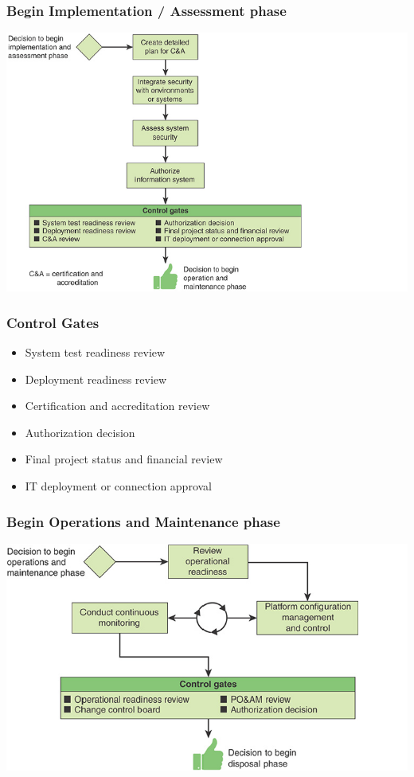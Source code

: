 \subsubsection{Begin Implementation / Assessment phase}
\includegraphics[width=\linewidth]{../img/develop_and_test2.png}

\subsubsection{Control Gates}
\begin{itemize}
    \item System test readiness review
    \item Deployment readiness review
    \item Certification and accreditation review
    \item Authorization decision
    \item Final project status and financial review
    \item IT deployment or connection approval
\end{itemize}

\subsubsection{Begin Operations and Maintenance phase}
\includegraphics[width=\linewidth]{../img/develop_and_test3.png}

